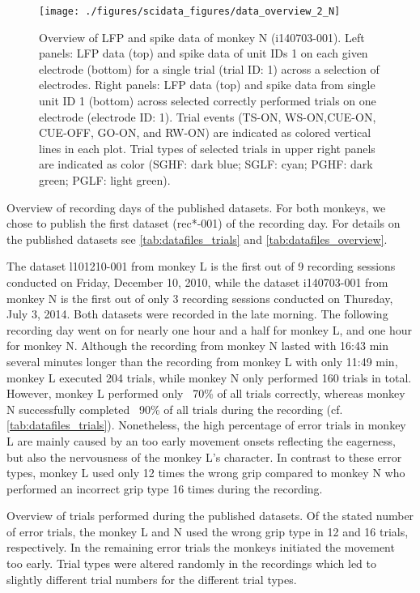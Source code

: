 {\begin{figure}
 \texttt{[image: ./figures/scidata\_figures/data\_overview\_2\_N]}
 \caption[Overview of LFP and spike data of monkey N (i140703-001)]{Overview of LFP and spike data of monkey N (i140703-001). Left panels: LFP data (top) and spike data of unit IDs 1 on each given electrode (bottom) for a single trial (trial ID: 1) across a selection of electrodes. Right panels: LFP data (top) and spike data from single unit ID 1 (bottom) across selected correctly performed trials on one electrode (electrode ID: 1). Trial events (TS-ON, WS-ON,CUE-ON, CUE-OFF, GO-ON, and RW-ON) are indicated as colored vertical lines in each plot. Trial types of selected trials in upper right panels are indicated as color (SGHF: dark blue; SGLF: cyan; PGHF: dark green; PGLF: light green).}
 \label{fig:overview_data_n_2}
\end{figure}


Overview of recording days of the published datasets. For both monkeys, we chose to publish the first dataset (rec*-001) of the recording day. For details on the published datasets see \cref{tab:datafiles_trials} and \cref{tab:datafiles_overview}.

The dataset l101210-001 from monkey L is the first out of 9 recording sessions conducted on Friday, December 10, 2010, while the dataset i140703-001 from monkey N is the first out of only 3 recording sessions conducted on Thursday, July 3, 2014. Both datasets were recorded in the late morning. The following recording day went on for nearly one hour and a half for monkey L, and one hour for monkey N. Although the recording from monkey N lasted with 16:43 min several minutes longer than the recording from monkey L with only 11:49 min, monkey L executed 204 trials, while monkey N only performed 160 trials in total. However, monkey L performed only ~70\% of all trials correctly, whereas monkey N successfully completed ~90\% of all trials during the recording (cf. \cref{tab:datafiles_trials}). Nonetheless, the high percentage of error trials in monkey L are mainly caused by an too early movement onsets reflecting the eagerness, but also the nervousness of the monkey L's character. In contrast to these error types, monkey L used only 12 times the wrong grip compared to monkey N who performed an incorrect grip type 16 times during the recording. 

Overview of trials performed during the published datasets. Of the stated number of error trials, the monkey L and N used the wrong grip type in 12 and 16 trials, respectively. In the remaining error trials the monkeys initiated the movement too early. Trial types were altered randomly in the recordings which led to slightly different trial numbers for the different trial types.

}
